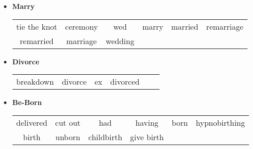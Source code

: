 \documentclass[11pt, oneside]{article}   	%
\begin{document}
\begin{itemize}
\begin{itemize}
\begin{tabular}{ c c c c c c }
	\end{tabular}
	\item[] \textbf{Marry} \\
		 \begin{tabular}{ c c c c c c }
		tie the knot & ceremony & wed & marry & married & remarriage\\remarried & marriage & wedding			\end{tabular}
	\item[] \textbf{Divorce} \\
		 \begin{tabular}{ c c c c c c }
		breakdown & divorce & ex & divorced
		\end{tabular}
	\item[] \textbf{Be-Born} \\
		 \begin{tabular}{ c c c c c c }
		delivered & cut out & had & having & born & hypnobirthing\\birth & unborn & childbirth & give birth			\end{tabular}
	\end{itemize}
	

\end{itemize}
\end{document}
